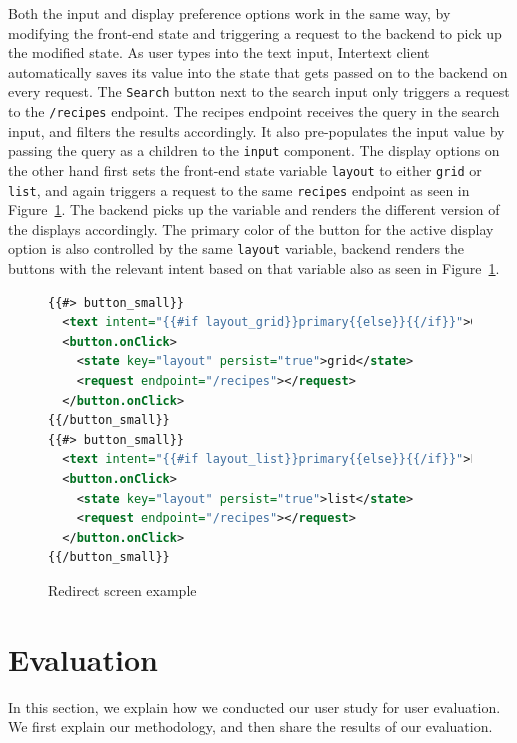 Both the input and display preference options work in the same way, by modifying the front-end state and triggering a request to the backend to pick up the modified state. As user types into the text input, Intertext client automatically saves its value into the state that gets passed on to the backend on every request. The \texttt{Search} button next to the search input only triggers a request to the \texttt{/recipes} endpoint. The recipes endpoint receives the query in the search input, and filters the results accordingly. It also pre-populates the input value by passing the query as a children to the \texttt{input} component. The display options on the other hand first sets the front-end state variable \texttt{layout} to either \texttt{grid} or \texttt{list}, and again triggers a request to the same \texttt{recipes} endpoint as seen in Figure~\ref{fig:rec_display_options}. The backend picks up the variable and renders the different version of the displays accordingly. The primary color of the button for the active display option is also controlled by the same \texttt{layout} variable, backend renders the buttons with the relevant intent based on that variable also as seen in Figure~\ref{fig:rec_display_options}.

\begin{figure}[htb]
\begin{minipage}{\linewidth}
\begin{lstlisting}[language=xml]
{{#> button_small}}
  <text intent="{{#if layout_grid}}primary{{else}}{{/if}}">Grid</text>
  <button.onClick>
    <state key="layout" persist="true">grid</state>
    <request endpoint="/recipes"></request>
  </button.onClick>
{{/button_small}}
{{#> button_small}}
  <text intent="{{#if layout_list}}primary{{else}}{{/if}}">List</text>
  <button.onClick>
    <state key="layout" persist="true">list</state>
    <request endpoint="/recipes"></request>
  </button.onClick>
{{/button_small}}
\end{lstlisting}
\end{minipage}
\caption{Redirect screen example}%
\label{fig:rec_display_options}%
\end{figure}


\section{Evaluation}

In this section, we explain how we conducted our user study for user evaluation. We first explain our methodology, and then share the results of our evaluation.


